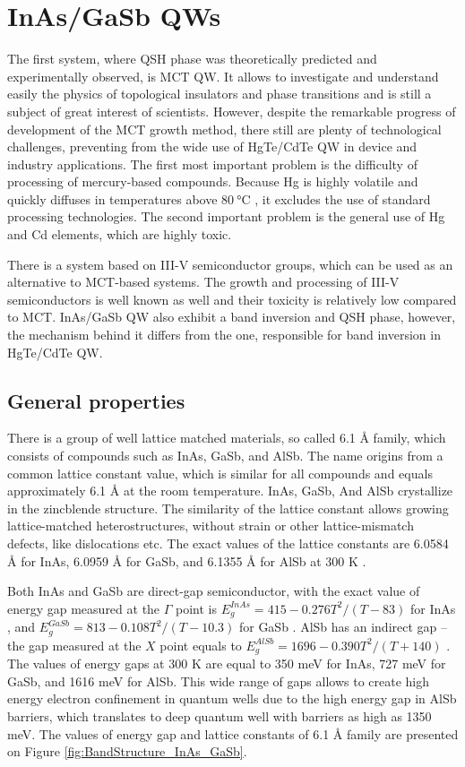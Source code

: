 \documentclass[titlepage,a4paper]{book}
\newcommand{\wciecie}{\quad\phantom{v}}
\begin{document}
\chapter{InAs/GaSb QWs}
\label{Appendix_InAs}
\wciecie
The first system, where QSH phase was theoretically predicted and experimentally observed, is MCT QW. It allows to investigate and understand easily the physics of topological insulators and phase transitions and is still a subject of great interest of scientists. However, despite the remarkable progress of development of the MCT growth method, there still are plenty of technological challenges, preventing from the wide use of HgTe/CdTe QW in device and industry applications. The first most important problem is the difficulty of processing of mercury-based compounds. Because Hg is highly volatile and quickly diffuses in temperatures above $\SI{80}{\degreeCelsius}$ \cite{Daumer_MCT_temperature}, it excludes the use of standard processing technologies. The second important problem is the general use of Hg and Cd elements, which are highly toxic.

There is a system based on III-V semiconductor groups, which can be used as an alternative to MCT-based systems. The growth and processing of III-V semiconductors is well known as well and their toxicity is relatively low compared to MCT. InAs/GaSb QW also exhibit a band inversion and QSH phase, however, the mechanism behind it differs from the one, responsible for band inversion in HgTe/CdTe QW.

\section{General properties}
There is a group of well lattice matched materials, so called 6.1 Å family, which consists of compounds such as InAs, GaSb, and AlSb. The name origins from a common lattice constant value, which is similar for all compounds and equals approximately 6.1 Å at the room temperature. InAs, GaSb, And AlSb crystallize in the zincblende structure. The similarity of the lattice constant allows growing lattice-matched heterostructures, without strain or other lattice-mismatch defects, like dislocations etc. The exact values of the lattice constants are 6.0584 Å for InAs, 6.0959 Å for GaSb, and 6.1355 Å for AlSb at 300 K \cite{Sze}.

Both InAs and GaSb are direct-gap semiconductor, with the exact value of energy gap measured at the $\Gamma$ point is $E_g^{InAs} = 415-0.276 T^2/(T-83)$ for InAs \cite{Fang_InAs}, and $E_g^{GaSb} = 813 - 0.108 T^2/(T-10.3)$ for GaSb \cite{Wu_GaSb}. AlSb has an indirect gap – the gap measured at the $X$ point equals to $E_g^{AlSb} = 1696 - 0.390 T^2/(T+140)$ \cite{Vurgaftman_AlSb}. The values of energy gaps at 300 K are equal to 350 meV for InAs, 727 meV for GaSb, and 1616 meV for AlSb. This wide range of gaps allows to create high energy electron confinement in quantum wells due to the high energy gap in AlSb barriers, which translates to deep quantum well with barriers as high as 1350 meV. The values of energy gap and lattice constants of 6.1 Å family are presented on Figure \ref{fig:BandStructure_InAs_GaSb}.
\end{document}
